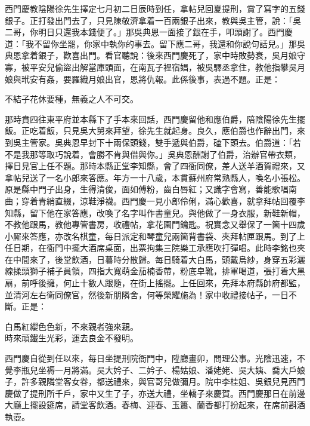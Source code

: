西門慶教陰陽徐先生擇定七月初二日辰時到任，拿帖兒回夏提刑，賞了寫字的五錢銀子。正打發出門去了，只見陳敬濟拿着一百兩銀子出來，教與吳主管，說：「吳二哥，你明日只還我本錢便了。」那吳典恩一面接了銀在手，叩頭謝了。西門慶道：「我不留你坐罷，你家中執你的事去。留下應二哥，我還和你說句話兒。」那吳典恩拿着銀子，歡喜出門。看官聽說：後來西門慶死了，家中時敗勢衰，吳月娘守寡，被平安兒偷盜出解當庫頭面，在南瓦子裡宿娼，被吳驛丞拿住，教他指攀吳月娘與玳安有姦，要羅織月娘出官，恩將仇報。此係後事，表過不題。正是：

\begin{myquote}
不結子花休要種，無義之人不可交。
\end{myquote}

那時賁四往東平府並本縣下了手本來回話，西門慶留他和應伯爵，陪陰陽徐先生擺飯。正吃着飯，只見吳大舅來拜望，徐先生就起身。良久，應伯爵也作辭出門，來到吳主管家。吳典恩早封下十兩保頭錢，雙手遞與伯爵，磕下頭去。伯爵道：「若不是我那等取巧說着，會勝不肯與借與你。」{}吳典恩酬謝了伯爵，治辦官帶衣類，擇日見官上任不題。那時本縣正堂李知縣，會了四衙同僚，差人送羊酒賀禮來，又拿帖兒送了一名小郎來答應。年方一十八歲，本貫蘇州府常熟縣人，喚名小張松。原是縣中門子出身，生得清俊，面如傅粉，齒白唇紅；又識字會寫，善能歌唱南曲；穿着青綃直綴，涼鞋淨襪。西門慶一見小郎伶俐，滿心歡喜，就拿拜帖回覆李知縣，留下他在家答應，改喚了名字叫作書童兒。與他做了一身衣服，新鞋新帽，不教他跟馬，教他專管書房，收禮帖，拿花園門鑰匙。祝實念又舉保了一箇十四歲小厮來答應，亦改名棋童，每日派定和琴童兒兩箇背書袋、夾拜帖匣跟馬。到了上任日期，在衙門中擺大酒席桌面，出票拘集三院樂工承應吹打彈唱。此時李銘也夾在中間來了，後堂飲酒，日暮時分散歸。每日騎着大白馬，頭戴烏紗，身穿五彩灑線揉頭獅子補子員領，四指大寬萌金茄楠香帶，粉底皁靴，排軍喝道，張打着大黑扇，前呼後擁，何止十數人跟隨，在街上搖擺。{}上任回來，先拜本府縣帥府都監，並清河左右衛同僚官，然後新朋隣舍，何等榮耀施為！家中收禮接帖子，一日不斷。正是：

\begin{myquote}
白馬紅纓色色新，不來親者強來親。\\時來頑鐵生光彩，運去良金不發明。
\end{myquote}

西門慶自從到任以來，每日坐提刑院衙門中，陞廳畫卯，問理公事。光陰迅速，不覺李瓶兒坐褥一月將滿。吳大妗子、二妗子、楊姑娘、潘姥姥、吳大姨、喬大戶娘子，許多親隣堂客女眷，都送禮來，與官哥兒做彌月。院中李桂姐、吳銀兒見西門慶做了提刑所千戶，家中又生了子，亦送大禮，坐轎子來慶賀。西門慶那日在前邊大廳上擺設筵席，請堂客飲酒。春梅、迎春、玉簫、蘭香都打扮起來，在席前斟酒執壺。

